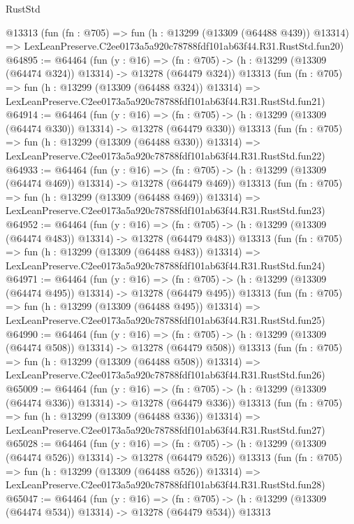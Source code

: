 \begin{lexlean}{RustStd}
\begin{coremodule}
    @13313
    (fun (fn : @705) =>
    fun (h : @13299 (@13309 (@64488 @439)) @13314) =>
    LexLeanPreserve.C2ee0173a5a920c78788fdf101ab63f44.R31.RustStd.fun20)
@64895 := @64464
    (fun (y : @16) =>
    (fn : @705) -> (h : @13299 (@13309 (@64474 @324)) @13314) -> @13278 (@64479 @324))
    @13313
    (fun (fn : @705) =>
    fun (h : @13299 (@13309 (@64488 @324)) @13314) =>
    LexLeanPreserve.C2ee0173a5a920c78788fdf101ab63f44.R31.RustStd.fun21)
@64914 := @64464
    (fun (y : @16) =>
    (fn : @705) -> (h : @13299 (@13309 (@64474 @330)) @13314) -> @13278 (@64479 @330))
    @13313
    (fun (fn : @705) =>
    fun (h : @13299 (@13309 (@64488 @330)) @13314) =>
    LexLeanPreserve.C2ee0173a5a920c78788fdf101ab63f44.R31.RustStd.fun22)
@64933 := @64464
    (fun (y : @16) =>
    (fn : @705) -> (h : @13299 (@13309 (@64474 @469)) @13314) -> @13278 (@64479 @469))
    @13313
    (fun (fn : @705) =>
    fun (h : @13299 (@13309 (@64488 @469)) @13314) =>
    LexLeanPreserve.C2ee0173a5a920c78788fdf101ab63f44.R31.RustStd.fun23)
@64952 := @64464
    (fun (y : @16) =>
    (fn : @705) -> (h : @13299 (@13309 (@64474 @483)) @13314) -> @13278 (@64479 @483))
    @13313
    (fun (fn : @705) =>
    fun (h : @13299 (@13309 (@64488 @483)) @13314) =>
    LexLeanPreserve.C2ee0173a5a920c78788fdf101ab63f44.R31.RustStd.fun24)
@64971 := @64464
    (fun (y : @16) =>
    (fn : @705) -> (h : @13299 (@13309 (@64474 @495)) @13314) -> @13278 (@64479 @495))
    @13313
    (fun (fn : @705) =>
    fun (h : @13299 (@13309 (@64488 @495)) @13314) =>
    LexLeanPreserve.C2ee0173a5a920c78788fdf101ab63f44.R31.RustStd.fun25)
@64990 := @64464
    (fun (y : @16) =>
    (fn : @705) -> (h : @13299 (@13309 (@64474 @508)) @13314) -> @13278 (@64479 @508))
    @13313
    (fun (fn : @705) =>
    fun (h : @13299 (@13309 (@64488 @508)) @13314) =>
    LexLeanPreserve.C2ee0173a5a920c78788fdf101ab63f44.R31.RustStd.fun26)
@65009 := @64464
    (fun (y : @16) =>
    (fn : @705) -> (h : @13299 (@13309 (@64474 @336)) @13314) -> @13278 (@64479 @336))
    @13313
    (fun (fn : @705) =>
    fun (h : @13299 (@13309 (@64488 @336)) @13314) =>
    LexLeanPreserve.C2ee0173a5a920c78788fdf101ab63f44.R31.RustStd.fun27)
@65028 := @64464
    (fun (y : @16) =>
    (fn : @705) -> (h : @13299 (@13309 (@64474 @526)) @13314) -> @13278 (@64479 @526))
    @13313
    (fun (fn : @705) =>
    fun (h : @13299 (@13309 (@64488 @526)) @13314) =>
    LexLeanPreserve.C2ee0173a5a920c78788fdf101ab63f44.R31.RustStd.fun28)
@65047 := @64464
    (fun (y : @16) =>
    (fn : @705) -> (h : @13299 (@13309 (@64474 @534)) @13314) -> @13278 (@64479 @534))
    @13313

\end{coremodule}
\end{lexlean}
